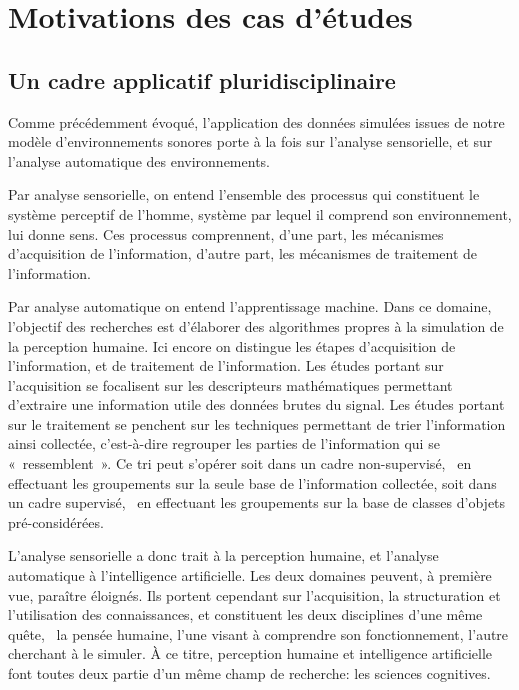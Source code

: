 \section{Motivations des cas d'études}

\subsection{Un cadre applicatif pluridisciplinaire}

Comme précédemment évoqué, l'application des données simulées issues de notre modèle d’environnements sonores porte à la fois sur l'analyse sensorielle, et sur l'analyse automatique des environnements.

Par analyse sensorielle, on entend l'ensemble des processus qui constituent le système perceptif de l'homme, système par lequel il comprend son environnement, lui donne sens. Ces processus comprennent, d'une part, les mécanismes d'acquisition de l'information, d'autre part, les mécanismes de traitement de l'information.

Par analyse automatique on entend l'apprentissage machine. Dans ce domaine, l'objectif des recherches est d'élaborer des algorithmes propres à la simulation de la perception humaine. Ici encore on distingue les étapes d'acquisition de l'information, et de traitement de l'information. Les études portant sur l'acquisition se focalisent sur les descripteurs mathématiques permettant d'extraire une information utile des données brutes du signal. Les études portant sur le traitement se penchent sur les techniques permettant de trier l'information ainsi collectée, c’est-à-dire regrouper les parties de l'information qui se «~ressemblent~». Ce tri peut s'opérer soit dans un cadre non-supervisé, \ie~en effectuant les groupements sur la seule base de l'information collectée, soit dans un cadre supervisé, \ie~en effectuant les groupements sur la base de classes d'objets pré-considérées.

L'analyse sensorielle a donc trait à la perception humaine, et l'analyse automatique à l'intelligence artificielle. Les deux domaines peuvent, à première vue, paraître éloignés. Ils portent cependant sur l'acquisition, la structuration et l'utilisation des connaissances, et constituent les deux disciplines d'une même quête, \ie~la pensée humaine, l'une visant à comprendre son fonctionnement, l'autre cherchant à le simuler. À ce titre, perception humaine et intelligence artificielle font toutes deux partie d'un même champ de recherche: les sciences cognitives.

